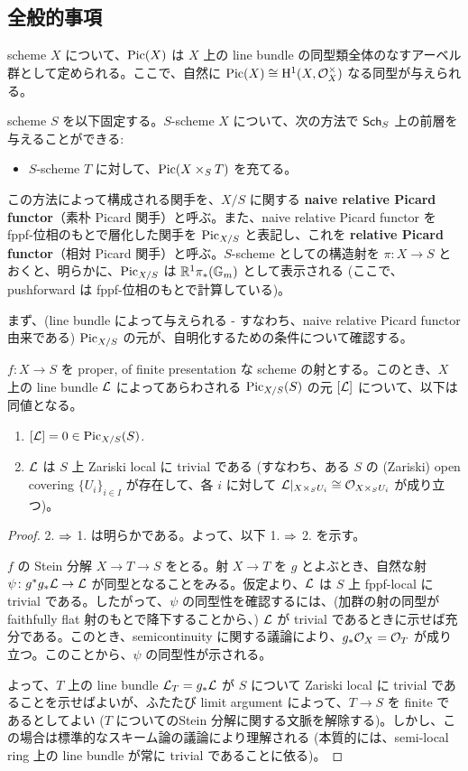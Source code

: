 \subsection{全般的事項}
scheme $X$ について、$\mathrm{Pic}(X)$ は $X$ 上の line bundle の同型類全体のなすアーベル群として定められる。ここで、自然に $\mathrm{Pic}(X) \cong \mathrm{H}^1(X, \mathcal{O}_X^\times)$ なる同型が与えられる。

scheme $S$ を以下固定する。$S$-scheme $X$ について、次の方法で $\mathsf{Sch}_S$ 上の前層を与えることができる:
\begin{itemize}
  \item $S$-scheme $T$ に対して、$\mathrm{Pic}(X \times_S T)$ を充てる。
\end{itemize}

この方法によって構成される関手を、$X / S$ に関する \textbf{naive relative Picard functor}（素朴 Picard 関手）と呼ぶ。また、naive relative Picard functor を fppf-位相のもとで層化した関手を $\mathrm{Pic}_{X / S}$ と表記し、これを \textbf{relative Picard functor}（相対 Picard 関手）と呼ぶ。$S$-scheme としての構造射を $\pi \colon X \to S$ とおくと、明らかに、$\mathrm{Pic}_{X / S}$ は $\mathbb{R}^1\pi_*(\mathbb{G}_m)$ として表示される (ここで、pushforward は fppf-位相のもとで計算している)。

まず、(line bundle によって与えられる - すなわち、naive relative Picard functor 由来である) $\mathrm{Pic}_{X / S}$ の元が、自明化するための条件について確認する。

\begin{lem}\label{Lem:Triviality_ElemPicFunc}
  $f \colon X \to S$ を proper, of finite presentation な scheme の射とする。このとき、$X$ 上の line bundle $\mathcal{L}$ によってあらわされる $\mathrm{Pic}_{X / S}(S)$ の元 $[\mathcal{L}]$ について、以下は同値となる。
  \begin{enumerate}
    \item $[\mathcal{L}] = 0 \in \mathrm{Pic}_{X / S}(S)$.
    \item $\mathcal{L}$ は $S$ 上 Zariski local に trivial である (すなわち、ある $S$ の (Zariski) open covering $\{U_i\}_{i \in I}$ が存在して、各 $i$ に対して $\mathcal{L}|_{X \times_S U_i} \cong \mathcal{O}_{X \times_S U_i}$ が成り立つ)。
  \end{enumerate}
\end{lem}
\begin{proof}
  2. $\Rightarrow$ 1. は明らかである。よって、以下 1. $\Rightarrow$ 2. を示す。

  $f$ の Stein 分解 $X \to T \to S$ をとる。射 $X \to T$ を $g$ とよぶとき、自然な射 $\psi \colon g^*g_*\mathcal{L} \to \mathcal{L}$ が同型となることをみる。仮定より、$\mathcal{L}$ は $S$ 上 fppf-local に trivial である。したがって、$\psi$ の同型性を確認するには、(加群の射の同型が faithfully flat 射のもとで降下することから、) $\mathcal{L}$ が trivial であるときに示せば充分である。このとき、semicontinuity に関する議論により、$g_*\mathcal{O}_X = \mathcal{O}_T$ が成り立つ。このことから、$\psi$ の同型性が示される。

  よって、$T$ 上の line bundle $\mathcal{L}_T = g_*\mathcal{L}$ が $S$ について Zariski local に trivial であることを示せばよいが、ふたたび limit argument によって、$T \to S$ を finite であるとしてよい ($T$ についてのStein 分解に関する文脈を解除する)。しかし、この場合は標準的なスキーム論の議論により理解される (本質的には、semi-local ring 上の line bundle が常に trivial であることに依る)。
\end{proof}


